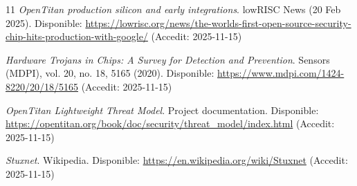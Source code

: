 \documentclass[10pt,a4paper,twocolumn,twoside]{article}
\begin{document}
\begin{thebibliography}{11}
\emph{OpenTitan production silicon and early integrations}. 
lowRISC News (20 Feb 2025). Disponible: \url{https://lowrisc.org/news/the-worlds-first-open-source-security-chip-hits-production-with-google/} (Accedit: 2025-11-15)

\emph{Hardware Trojans in Chips: A Survey for Detection and Prevention}. 
Sensors (MDPI), vol. 20, no. 18, 5165 (2020). Disponible: \url{https://www.mdpi.com/1424-8220/20/18/5165} (Accedit: 2025-11-15)

\emph{OpenTitan Lightweight Threat Model}. 
Project documentation. Disponible: \url{https://opentitan.org/book/doc/security/threat_model/index.html} (Accedit: 2025-11-15)

\emph{Stuxnet}. 
Wikipedia. Disponible: \url{https://en.wikipedia.org/wiki/Stuxnet} (Accedit: 2025-11-15)

\end{thebibliography}
\appendix
{}
\end{document}
